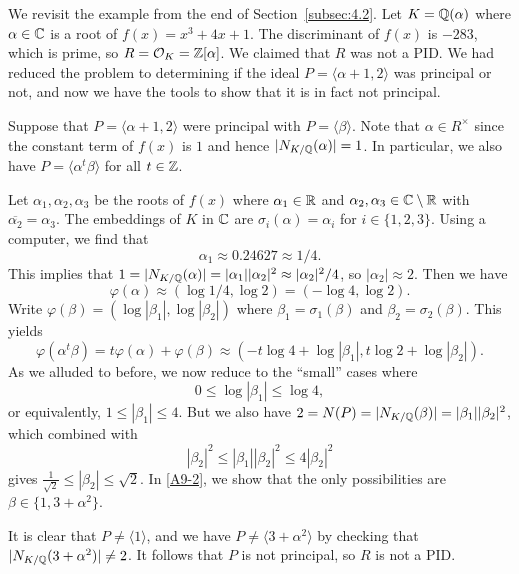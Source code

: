 We revisit the example from the end of Section~\ref{subsec:4.2}. 
Let $K = \mathbb{Q}(\alpha)$ where $\alpha \in \mathbb{C}$ is a root of $f(x) = x^3 + 4x + 1$. 
The discriminant of $f(x)$ is $-283$, which is prime, so $R = {\cal O}_K = \mathbb{Z}[\alpha]$. 
We claimed that $R$ was not a PID. We had reduced the problem to determining 
if the ideal $P = \langle \alpha + 1, 2 \rangle$ was principal or not, 
and now we have the tools to show that it is in fact not principal.

Suppose that $P = \langle \alpha + 1, 2 \rangle$ were principal with 
$P = \langle \beta \rangle$. Note that $\alpha \in R^\times$ since 
the constant term of $f(x)$ is $1$ and hence $|N_{K/\mathbb{Q}}(\alpha)| = 1$.
In particular, we also have $P = \langle \alpha^t \beta \rangle$ for all $t \in \mathbb{Z}$. 

Let $\alpha_1, \alpha_2, \alpha_3$ be the roots of $f(x)$ where $\alpha_1 \in \mathbb{R}$ 
and $\alpha_2, \alpha_3 \in \mathbb{C} \setminus \mathbb{R}$ with $\overline{\alpha_2} = \alpha_3$. 
The embeddings of $K$ in $\mathbb{C}$ are $\sigma_i(\alpha) = \alpha_i$ for $i \in \{1, 2, 3\}$. 
Using a computer, we find that 
\[ \alpha_1 \approx 0.24627 \approx 1/4. \] 
This implies that $1 = |N_{K/\mathbb{Q}}(\alpha)| = |\alpha_1||\alpha_2|^2 \approx 
|\alpha_2|^2/4$, so $|\alpha_2| \approx 2$. Then we have 
\[ \varphi(\alpha) \approx (\log 1/4, \log 2) = (-\log 4, \log 2). \] 
Write $\varphi(\beta) = (\log |\beta_1|, \log |\beta_2|)$ where 
$\beta_1 = \sigma_1(\beta)$ and $\beta_2 = \sigma_2(\beta)$. This yields 
\[ \varphi(\alpha^t \beta) = t\varphi(\alpha) + \varphi(\beta) 
\approx (-t \log 4 + \log |\beta_1|, t\log 2 + \log|\beta_2|). \] 
As we alluded to before, we now reduce to the ``small'' cases where 
\[ 0 \leq \log |\beta_1| \leq \log 4, \] 
or equivalently, $1 \leq |\beta_1| \leq 4$. But we also have 
$2 = N(P) = |N_{K/\mathbb{Q}}(\beta)| = |\beta_1||\beta_2|^2$, which combined with
\[ |\beta_2|^2 \leq |\beta_1||\beta_2|^2 \leq 4|\beta_2|^2 \] 
gives $\frac{1}{\sqrt{2}} \leq |\beta_2| \leq \sqrt{2}$. In \ref{A9-2}, 
we show that the only possibilities are $\beta \in \{1, 3 + \alpha^2\}$. 

It is clear that $P \neq \langle 1 \rangle$, and we have $P \neq 
\langle 3 + \alpha^2 \rangle$ by checking that $|N_{K/\mathbb{Q}}(3+\alpha^2)| \neq 2$. 
It follows that $P$ is not principal, so $R$ is not a PID. 


